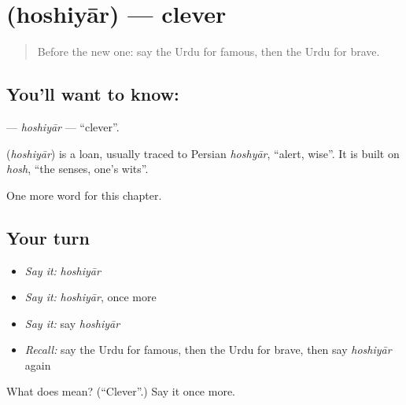 \section[\texorpdfstring{\ur{ہوشیار} (hoshiyār)}{ہوشیار (hoshiyār)}]{ (hoshiyār) — clever}

\label{lesson:UR-C135-hoshiyar}



\begin{quote}
Before the new one: say the Urdu for famous, then the Urdu for brave.
\end{quote}

\subsection*{You'll want to know: }
\textbf{} — \emph{hoshiyār} — \textquotedblleft{}clever\textquotedblright{}.

\begin{cousinweb}
\textbf{} (\emph{hoshiyār}) is a loan, usually traced to Persian \emph{hoshyār}, \textquotedblleft{}alert, wise\textquotedblright{}. It is built on \emph{hosh}, \textquotedblleft{}the senses, one's wits\textquotedblright{}.
\end{cousinweb}

\begin{grammarlens}[title={What you've built}]
One more word for this chapter.
\end{grammarlens}

\subsection*{Your turn}
\begin{itemize}
\raggedright
  \item \emph{Say it:} \emph{hoshiyār}
  \item \emph{Say it:} \emph{hoshiyār}, once more
  \item \emph{Say it:} say \emph{hoshiyār}
  \item \emph{Recall:} say the Urdu for famous, then the Urdu for brave, then say \emph{hoshiyār} again
\end{itemize}

\begin{tcolorbox}[breakable,colback=teal!4,colframe=teal!35!black,title={Before you move on}]
What does  mean? (\textquotedblleft{}Clever\textquotedblright{}.) Say it once more.
\end{tcolorbox}
